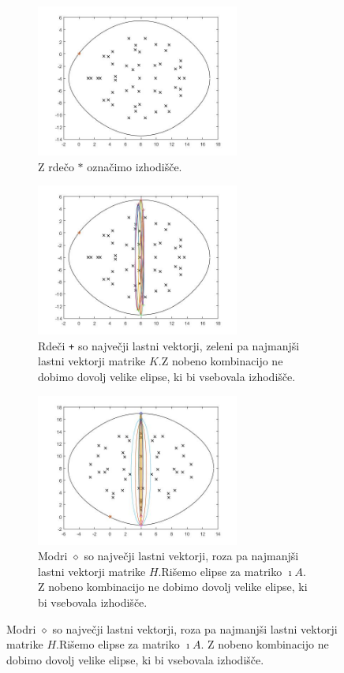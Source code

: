 \documentclass[12pt,a4paper]{amsart}
\theoremstyle{definition}
\theoremstyle{plain}
\begin{document}
\begin{figure}[H]
\renewcommand*\thesubfigure{\Alph{subfigure}}
\begin{subfigure}[t]{0.45\textwidth}
\includegraphics[width=0.9\linewidth,height=5cm]{RC4.jpg}
\caption{Z rdečo $\ast$ označimo izhodišče.}
\label{fig:p61}
\end{subfigure}%
\hfill
\begin{subfigure}[t]{0.45\textwidth}
\includegraphics[width=0.9\linewidth,height=5cm]{RC4e1.jpg}
\caption{Rdeči \verb~+~ so največji lastni vektorji, zeleni pa najmanjši lastni vektorji matrike $K$.\footnotemark[\value{footnote}] Z nobeno kombinacijo ne dobimo dovolj velike elipse, ki bi vsebovala izhodišče.}
\label{fig:p62}
\end{subfigure}
\begin{subfigure}[t]{0.45\textwidth}
\includegraphics[width=0.9\linewidth,height=5cm]{RC4e2.jpg}
\caption{Modri $\diamond$ so največji lastni vektorji, roza pa najmanjši lastni vektorji matrike $H$.\footnotemark[\value{footnote}] Rišemo elipse za matriko $\imath A$. Z nobeno kombinacijo ne dobimo dovolj velike elipse, ki bi vsebovala izhodišče.}

\end{subfigure}
\end{figure}
\end{document}
